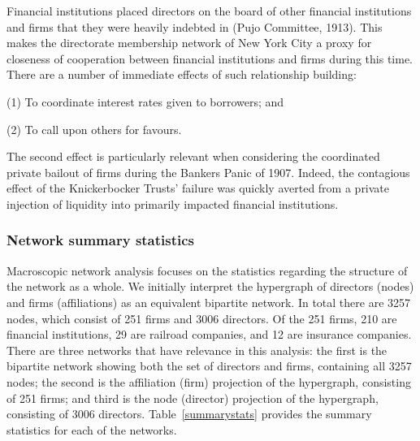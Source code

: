 Financial institutions placed directors on the board of other financial institutions and firms that they were heavily indebted in (Pujo Committee, 1913). This makes the directorate membership network of New York City a proxy for closeness of cooperation between financial institutions and firms during this time. There are a number of immediate effects of such relationship building:
\begin{abet}
\item[(1)] To coordinate interest rates given to borrowers; and
\item[(2)] To call upon others for favours.
\end{abet}
The second effect is particularly relevant when considering the coordinated private bailout of firms during the Bankers Panic of 1907. Indeed, the contagious effect of the Knickerbocker Trusts' failure was quickly averted from a private injection of liquidity into primarily impacted financial institutions.

\subsubsection*{Network summary statistics}

Macroscopic network analysis focuses on the statistics regarding the structure of the network as a whole. We initially interpret the hypergraph of directors (nodes) and firms (affiliations) as an equivalent bipartite network. In total there are 3257 nodes, which consist of 251 firms and 3006 directors. Of the 251 firms, 210 are financial institutions, 29 are railroad companies, and 12 are insurance companies. There are three networks that have relevance in this analysis: the first is the bipartite network showing both the set of directors and firms, containing all 3257 nodes; the second is the affiliation (firm) projection of the hypergraph, consisting of 251 firms; and third is the node (director) projection of the hypergraph, consisting of 3006 directors. Table~\ref{summarystats} provides the summary statistics for each of the networks.

